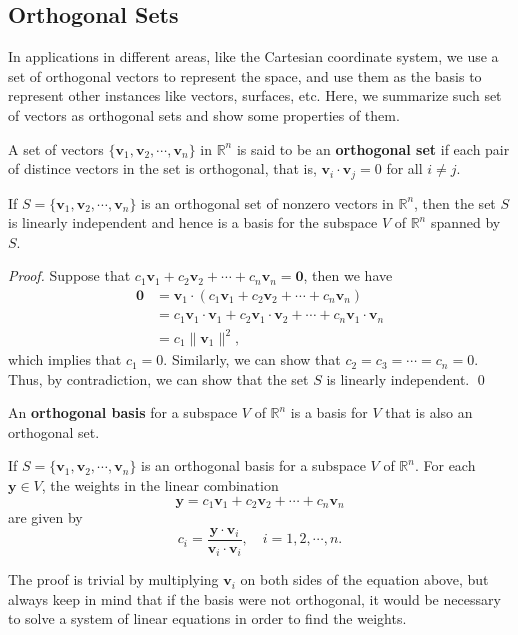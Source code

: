 \documentclass[10pt, a4paper]{article}
\newcommand{\R}{\mathbb{R}}
\newcommand{\vt}[1]{\mathbf{#1}}
\begin{document}
\subsection{Orthogonal Sets}
In applications in different areas, like the Cartesian coordinate system, we use a set of orthogonal vectors to represent the space, and use them as the basis to represent other instances like vectors, surfaces, etc.
Here, we summarize such set of vectors as orthogonal sets and show some properties of them.
\begin{definition}
    A set of vectors $\{\vt{v}_1, \vt{v}_2, \cdots, \vt{v}_n\}$ in $\R^n$ is said to be an \textbf{orthogonal set} if each pair of distince vectors in the set is orthogonal, that is,
    $\vt{v}_i \cdot \vt{v}_j = 0$ for all $i \neq j$.
\end{definition}
\begin{proposition}
    If $S=\{\vt{v}_1, \vt{v}_2, \cdots, \vt{v}_n\}$ is an orthogonal set of nonzero vectors in $\R^n$, then the set $S$ is linearly independent and hence is a basis for the subspace $V$ of $\R^n$ spanned by $S$.
\end{proposition}
\indent\textit{Proof.} Suppose that $c_1\vt{v}_1 + c_2\vt{v}_2 + \cdots + c_n\vt{v}_n = \vt{0}$, then we have
\begin{align*}
    \vt{0} &= \vt{v}_1 \cdot (c_1\vt{v}_1 + c_2\vt{v}_2 + \cdots + c_n\vt{v}_n) \\
    &= c_1\vt{v}_1 \cdot \vt{v}_1 + c_2\vt{v}_1 \cdot \vt{v}_2 + \cdots + c_n\vt{v}_1 \cdot \vt{v}_n \\
    &= c_1\|\vt{v}_1\|^2,
\end{align*}
which implies that $c_1 = 0$. Similarly, we can show that $c_2 = c_3 = \cdots = c_n = 0$. Thus, by contradiction, we can show that the set $S$ is linearly independent. \qed
\begin{definition}
    An \textbf{orthogonal basis} for a subspace $V$ of $\R^n$ is a basis for $V$ that is also an orthogonal set.
\end{definition}
\begin{proposition}
    If $S=\{\vt{v}_1, \vt{v}_2, \cdots, \vt{v}_n\}$ is an orthogonal basis for a subspace $V$ of $\R^n$. For each $\vt{y} \in V$, the weights in the linear combination\[
    \vt{y} = c_1\vt{v}_1 + c_2\vt{v}_2 + \cdots + c_n\vt{v}_n
    \]
    are given by\[
    c_i = \frac{\vt{y} \cdot \vt{v}_i}{\vt{v}_i \cdot \vt{v}_i}, \quad i = 1, 2, \cdots, n.
    \]
\end{proposition}
\indent The proof is trivial by multiplying $\vt{v}_i$ on both sides of the equation above, but always keep in mind that if the basis were not orthogonal, it would be necessary to solve a system of linear equations in order to find the weights.\\
\end{document}
